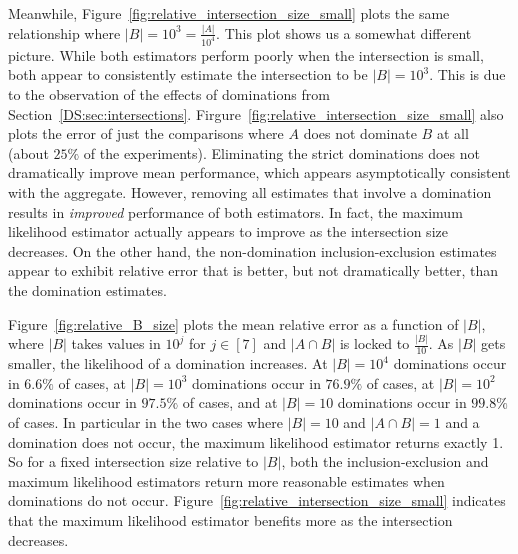 \documentclass[10]{report}
\begin{document}
Meanwhile, Figure~\ref{fig:relative_intersection_size_small} plots the same relationship where $|B| = 10^3 = \frac{|A|}{10^4}$.
This plot shows us a somewhat different picture. 
While both estimators perform poorly when the intersection is small, both appear to consistently estimate the intersection to be $|B| = 10^3$.
This is due to the observation of the effects of dominations from Section~\ref{DS:sec:intersections}.
Firgure~\ref{fig:relative_intersection_size_small} also plots the error of just the comparisons where $A$ does not dominate $B$ at all (about $25\%$ of the experiments). 
Eliminating the strict dominations does not dramatically improve mean performance, which appears asymptotically consistent with the aggregate.
However, removing all estimates that involve a domination results in \emph{improved} performance of both estimators.
In fact, the maximum likelihood estimator actually appears to improve as the intersection size decreases. 
On the other hand, the non-domination inclusion-exclusion estimates appear to exhibit relative error that is better, but not dramatically better, than the domination estimates.

Figure~\ref{fig:relative_B_size} plots the mean relative error as a function of $|B|$, where $|B|$ takes values in $10^j$ for $j \in [7]$ and $|A \cap B|$ is locked to $\frac{|B|}{10}$.
As $|B|$ gets smaller, the likelihood of a domination increases. 
At $|B|= 10^4$ dominations occur in $6.6\%$ of cases, at $|B|= 10^3$ dominations occur in $76.9\%$ of cases, at $|B|= 10^2$ dominations occur in $97.5\%$ of cases, and at $|B|= 10$ dominations occur in $99.8\%$ of cases.
In particular in the two cases where $|B|=10$ and $|A \cap B| = 1$ and a domination does not occur, the maximum likelihood estimator returns exactly 1. 
So for a fixed intersection size relative to $|B|$, both the inclusion-exclusion and maximum likelihood estimators return more reasonable estimates when dominations do not occur.
Figure~\ref{fig:relative_intersection_size_small} indicates that the maximum likelihood estimator benefits more as the intersection decreases. 
\end{document}

